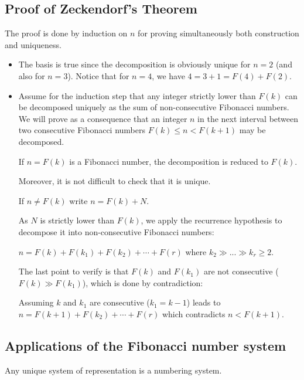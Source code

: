 \subsection{Proof of Zeckendorf's Theorem}

The proof is done by induction on $n$ for proving simultaneously both construction and uniqueness.

\begin{itemize}
\item
The basis is true since the decomposition is obviously unique for $n=2$ (and also for $n=3$). 
Notice that for $n=4$, we have $4 = 3 + 1 = F(4) + F(2)$. 

\item
Assume for the induction step that any integer strictly lower than $F(k)$ can be decomposed uniquely as the sum of non-consecutive Fibonacci numbers.
We will prove as a consequence that an integer $n$ in the next interval between two consecutive Fibonacci numbers $F(k) \leq n < F(k+1)$ may be decomposed. 

If $n=F(k)$ is a Fibonacci number, the decomposition is reduced to $F(k)$.

Moreover, it is not difficult to check that it is unique.


\medskip

If $n \neq F(k)$ write $n = F(k) + N$.

As $N$ is strictly lower than $F(k)$, we apply the recurrence hypothesis to decompose it into non-consecutive Fibonacci numbers:

$n = F(k) + F(k_1) + F(k_2) + \cdots + F(r)$ where $k_2 \gg ... \gg k_r \geq 2$. 

The last point to verify is that $F(k)$ and $F(k_1)$ are not consecutive ($F(k) \gg F(k_1)$), which is done by contradiction:

Assuming $k$ and $k_1$ are consecutive ($k_1=k-1$) leads to $n = F(k+1) + F(k_2) + \cdots + F(r)$
which contradicts $n < F(k+1)$.
\end{itemize}


\subsection{Applications of the Fibonacci number system}

Any unique system of representation is a numbering system.

